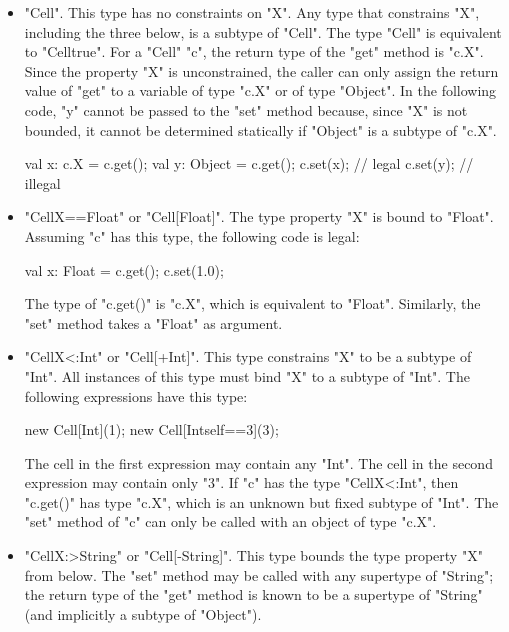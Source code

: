 \begin{itemize}
\item \xcd"Cell".  This type has no constraints on \xcd"X".
Any type that constrains \xcd"X", including the three below,
is a subtype of \xcd"Cell".  The type \xcd"Cell" is equivalent to
\xcd"Cell{true}".
%
For a \xcd"Cell" \xcd"c", the return type of the \xcd"get" method 
is \xcd"c.X".  
Since the property \xcd"X" is unconstrained,  
the caller can only assign the return value of \xcd"get"
to a variable of type \xcd"c.X" or of type \xcd"Object".
In the following code, \xcd"y" cannot be passed to the \xcd"set" method
because, since \xcd"X" is not bounded,
it cannot be determined statically if \xcd"Object" is a
subtype of \xcd"c.X".
\begin{xten}
val x: c.X = c.get();
val y: Object = c.get();
c.set(x); // legal
c.set(y); // illegal
\end{xten}

\item \xcd"Cell{X==Float}" or \xcd"Cell[Float]".
The type property \xcd"X" is bound to \xcd"Float".
Assuming \xcd"c" has this type, the following code is legal:
\begin{xten}
val x: Float = c.get();
c.set(1.0);
\end{xten}
The type of \xcd"c.get()" is \xcd"c.X", which is equivalent to
\xcd"Float".
Similarly, the \xcd"set" method takes a \xcd"Float" as argument.

\item \xcd"Cell{X<:Int}" or \xcd"Cell[+Int]".
This type constrains \xcd"X" to be a subtype of \xcd"Int".
All instances of this type must bind \xcd"X" to a subtype of \xcd"Int".
The following expressions have this type:
\begin{xten}
new Cell[Int](1);
new Cell[Int{self==3}](3);
\end{xten}
The cell in the first expression may contain any \xcd"Int".
The cell in the second expression may contain only \xcd"3".
%
If \xcd"c" has the type \xcd"Cell{X<:Int}",
then \xcd"c.get()" has type \xcd"c.X", which is an unknown but
fixed subtype of \xcd"Int".  The \xcd"set" method of \xcd"c" can
only be called with an object of type \xcd"c.X".

\item \xcd"Cell{X:>String}" or \xcd"Cell[-String]".  This type bounds the type property
\xcd"X"
from below.  The \xcd"set" method may be called with any
supertype of \xcd"String"; the return type of the \xcd"get"
method is known to be a
supertype of \xcd"String" (and implicitly a subtype of \xcd"Object").
\end{itemize}



